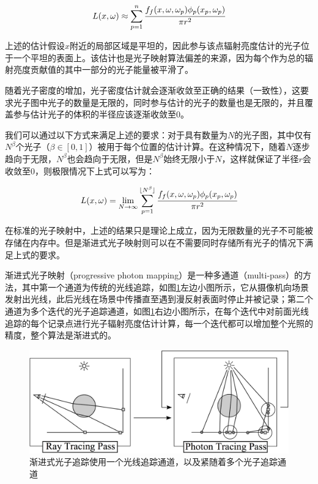\begin{equation}
	L(x,{\omega})\approx \sum^{n}_{p=1} \cfrac{f_f(x,{\omega},{\omega}_p)\phi_p(x_p,{\omega}_p)}{\pi r^{2}}
\end{equation}

上述的估计假设$x$附近的局部区域是平坦的，因此参与该点辐射亮度估计的光子位于一个平坦的表面上。该估计也是光子映射算法偏差的来源，因为每个作为总的辐射亮度贡献值的其中一部分的光子能量被平滑了。

随着光子密度的增加，光子密度估计就会逐渐收敛至正确的结果（一致性），这要求光子图中光子的数量是无限的，同时参与估计的光子的数量也是无限的，并且覆盖参与估计光子的体积的半径应该逐渐收敛至0。

我们可以通过以下方式来满足上述的要求：对于具有数量为$N$的光子图，其中仅有$N^{\beta}$个光子（$\beta\in[0,1]$）被用于每个位置的估计计算。在这种情况下，随着$N$逐步趋向于无限，$N^{\beta}$也会趋向于无限，但是$N^{\beta}$始终无限小于$N$，这样就保证了半径$r$会收敛至0，则极限情况下上式可以写为\cite{b:RealisticImageSynthesisUsingPhotonMapping}：

\begin{equation}\label{e:pm-consistent-equation}
	L(x,{\omega})=\lim_{N\to\infty} \sum^{\lfloor N^{\beta} \rfloor}_{p=1} \cfrac{f_f(x,{\omega},{\omega}_p)\phi_p(x_p,{\omega}_p)}{\pi r^{2}}
\end{equation}

在标准的光子映射中，上述的结果只是理论上成立，因为无限数量的光子不可能被存储在内存中。但是渐进式光子映射则可以在不需要同时存储所有光子的情况下满足上式的要求。

渐进式光子映射（progressive photon mapping）是一种多通道（multi-pass）的方法，其中第一个通道为传统的光线追踪，如图\ref{f:pm-progressive-photon-mapping}左边小图所示，它从摄像机向场景发射出光线，此后光线在场景中传播直至遇到漫反射表面时停止并被记录；第二个通道为多个迭代的光子追踪通道，如图\ref{f:pm-progressive-photon-mapping}右边小图所示，在每个迭代中对前面光线追踪的每个记录点进行光子辐射亮度估计计算，每一个迭代都可以增加整个光照的精度，整个算法是渐进式的。

\begin{figure}
	\includegraphics[width=\textwidth]{figures/pm/pm-18}
	\caption{渐进式光子追踪使用一个光线追踪通道，以及紧随着多个光子追踪通道}
	\label{f:pm-progressive-photon-mapping}
\end{figure}




